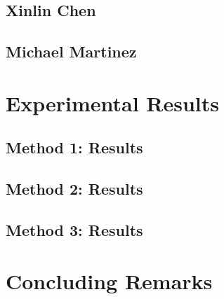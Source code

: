 \documentclass{article}
\begin{document}
\subsection{Xinlin Chen}

\subsection{Michael Martinez}

\section{Experimental Results}
\subsection{Method 1: Results}

\subsection{Method 2: Results}

\subsection{Method 3: Results}

\section{Concluding Remarks}



\end{document}
